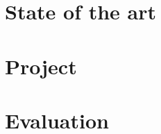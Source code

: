 



\frenchspacing
\raggedbottom
{}
\pagestyle{plain}

\cleardoublepage
\cleardoublepage
\cleardoublepage\tableofcontents
\clearpage
\cleardoublepage
\newpage
{}
\pagestyle{scrheadings}
\sloppy

\part{State of the art}\label{prt:stateOfArt}

\part{Project}\label{prt:project}



\part{Evaluation}\label{prt:evaluation}




\clearpage
\nocite{*}
{}



\printindex



